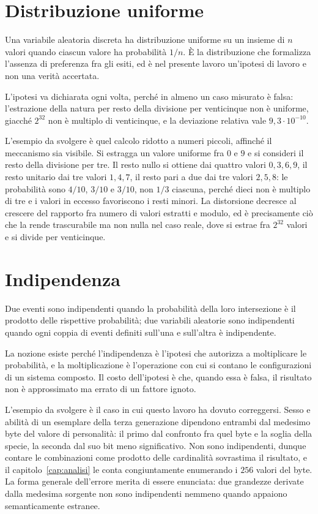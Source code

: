\section{Distribuzione uniforme}

Una variabile aleatoria discreta ha distribuzione uniforme su un insieme di $n$ valori quando ciascun valore ha probabilità $1/n$. È la distribuzione che formalizza l'assenza di preferenza fra gli esiti, ed è nel presente lavoro un'ipotesi di lavoro e non una verità accertata.

L'ipotesi va dichiarata ogni volta, perché in almeno un caso misurato è falsa: l'estrazione della natura per resto della divisione per venticinque non è uniforme, giacché $2^{32}$ non è multiplo di venticinque, e la deviazione relativa vale $9{,}3 \cdot 10^{-10}$.

L'esempio da svolgere è quel calcolo ridotto a numeri piccoli, affinché il meccanismo sia visibile. Si estragga un valore uniforme fra $0$ e $9$ e si consideri il resto della divisione per tre. Il resto nullo si ottiene dai quattro valori $0, 3, 6, 9$, il resto unitario dai tre valori $1, 4, 7$, il resto pari a due dai tre valori $2, 5, 8$: le probabilità sono $4/10$, $3/10$ e $3/10$, non $1/3$ ciascuna, perché dieci non è multiplo di tre e i valori in eccesso favoriscono i resti minori. La distorsione decresce al crescere del rapporto fra numero di valori estratti e modulo, ed è precisamente ciò che la rende trascurabile ma non nulla nel caso reale, dove si estrae fra $2^{32}$ valori e si divide per venticinque.

\section{Indipendenza}

Due eventi sono indipendenti quando la probabilità della loro intersezione è il prodotto delle rispettive probabilità; due variabili aleatorie sono indipendenti quando ogni coppia di eventi definiti sull'una e sull'altra è indipendente.

La nozione esiste perché l'indipendenza è l'ipotesi che autorizza a moltiplicare le probabilità, e la moltiplicazione è l'operazione con cui si contano le configurazioni di un sistema composto. Il costo dell'ipotesi è che, quando essa è falsa, il risultato non è approssimato ma errato di un fattore ignoto.

L'esempio da svolgere è il caso in cui questo lavoro ha dovuto correggersi. Sesso e abilità di un esemplare della terza generazione dipendono entrambi dal medesimo byte del valore di personalità: il primo dal confronto fra quel byte e la soglia della specie, la seconda dal suo bit meno significativo. Non sono indipendenti, dunque contare le combinazioni come prodotto delle cardinalità sovrastima il risultato, e il capitolo~\ref{cap:analisi} le conta congiuntamente enumerando i $256$ valori del byte. La forma generale dell'errore merita di essere enunciata: due grandezze derivate dalla medesima sorgente non sono indipendenti nemmeno quando appaiono semanticamente estranee.

